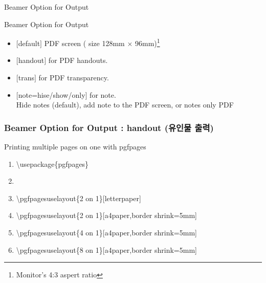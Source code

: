 \documentclass[ aspectratio=169,  10pt,blue,xcolor=pdftex,dvipsnames,table,handout,notes]{beamer}
\begin{document}
		\begin{frame}[t]{Beamer Option for Output}

			\begin{block} {Beamer Option for Output}
			\begin{itemize}
			\item	$[$default$]$ PDF screen ( size 128mm $\times$ 96mm)\footnote{ Monitor's 4:3 aspert ratio}
			\item	$[$handout$]$ for PDF handouts.
			\item	$[$trans$]$ for PDF transparency.
			\item	$[$note=hise/show/only$]$ for note. \\Hide notes (default), add note to the PDF screen, or notes only PDF
			\end{itemize}
			\end{block}



		\end{frame}









		\begin{frame}[t]
		\frametitle{Beamer Option for Output : handout (유인물 출력) }

			\begin{block} {Printing multiple pages on one with pgfpages}
			\begin{enumerate}
			\item[]	\textbackslash usepackage\{pgfpages\}
			\item[]	
			\item[]	\textbackslash pgfpagesuselayout\{2 on 1\}[letterpaper]
			\item[]	\textbackslash pgfpagesuselayout\{2 on 1\}[a4paper,border shrink=5mm]
			\item[]	\textbackslash pgfpagesuselayout\{4 on 1\}[a4paper,border shrink=5mm]
			\item[]	\textbackslash pgfpagesuselayout\{8 on 1\}[a4paper,border shrink=5mm]

			\end{enumerate}
			\end{block}
		\end{frame}
\end{document}
